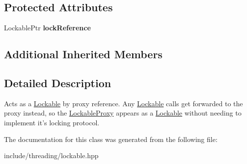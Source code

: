 \subsection*{Protected Attributes}
\begin{DoxyCompactItemize}
\item 
\hypertarget{classcore_1_1threading_1_1_lockable_proxy_afd06fd17e000e9aba3d1fc66ca6b82e8}{Lockable\-Ptr {\bfseries lock\-Reference}}\label{classcore_1_1threading_1_1_lockable_proxy_afd06fd17e000e9aba3d1fc66ca6b82e8}

\end{DoxyCompactItemize}
\subsection*{Additional Inherited Members}


\subsection{Detailed Description}
Acts as a \hyperlink{classcore_1_1threading_1_1_lockable}{Lockable} by proxy reference. Any \hyperlink{classcore_1_1threading_1_1_lockable}{Lockable} calls get forwarded to the proxy instead, so the \hyperlink{classcore_1_1threading_1_1_lockable_proxy}{Lockable\-Proxy} appears as a \hyperlink{classcore_1_1threading_1_1_lockable}{Lockable} without needing to implement it's locking protocol. 

The documentation for this class was generated from the following file\-:\begin{DoxyCompactItemize}
\item 
include/threading/lockable.\-hpp\end{DoxyCompactItemize}
